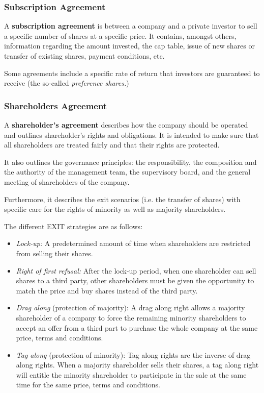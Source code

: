\documentclass[a4paper]{extarticle}
\begin{document}
\subsubsection{Subscription Agreement}

A \textbf{subscription agreement} is between a company and a private investor to sell a specific number of shares at a specific price. It contains, amongst others, information regarding the amount invested, the cap table, issue of new shares or transfer of existing shares, payment conditions, etc.

Some agreements include a specific rate of return that investors are guaranteed to receive (the so-called \textit{preference shares.})

\subsubsection{Shareholders Agreement}

A \textbf{shareholder's agreement} describes how the company should be operated and outlines shareholder's rights and obligations. It is intended to make sure that all shareholders are treated fairly and that their rights are protected.

It also outlines the governance principles: the responsibility, the composition and the authority of the management team, the supervisory board, and the general meeting of shareholders of the company.

Furthermore, it describes the exit scenarios (i.e. the transfer of shares) with specific care for the rights of minority as well as majority shareholders.

The different EXIT strategies are as follows:

\begin{itemize}
    \item \textit{Lock-up:} A predetermined amount of time when shareholders are restricted from selling their shares.
    \item \textit{Right of first refusal:} After the lock-up period, when one shareholder can sell shares to a third party, other shareholders must be given the opportunity to match the price and buy shares instead of the third party.
    \item \textit{Drag along} (protection of majority): A drag along right allows a majority shareholder of a company to force the remaining minority shareholders to accept an offer from a third part to purchase the whole company at the same price, terms and conditions.
    \item \textit{Tag along} (protection of minority): Tag along rights are the inverse of drag along rights. When a majority shareholder sells their shares, a tag along right will entitle the minority shareholder to participate in the sale at the same time for the same price, terms and conditions.
\end{itemize}
\end{document}
